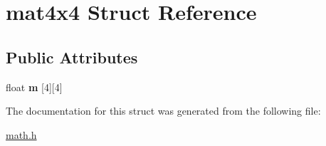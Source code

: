 \hypertarget{structmat4x4}{}\section{mat4x4 Struct Reference}
\label{structmat4x4}
\subsection*{Public Attributes}
\begin{DoxyCompactItemize}
\item 
\mbox{\label{structmat4x4_aeae950463c664461dfaf67b2373f5c5c}} 
float {\bfseries m} \mbox{[}4\mbox{]}\mbox{[}4\mbox{]}
\end{DoxyCompactItemize}


The documentation for this struct was generated from the following file\+:\begin{DoxyCompactItemize}
\item 
\hyperlink{math_8h}{math.\+h}\end{DoxyCompactItemize}
